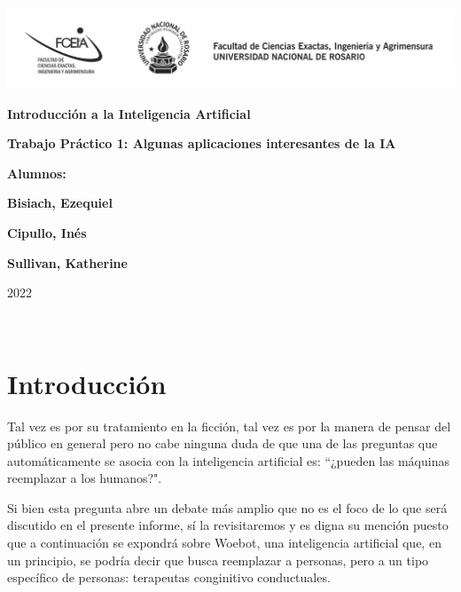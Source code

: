\documentclass[11pt]{article}
\begin{document}
\begin{titlepage}
    \hspace{-2.5cm}\includegraphics[scale= 0.48]{header.png}
    \begin{center}
        \vfill
            \noindent\textbf{\Huge Introducción a la Inteligencia Artificial}\par
            \vspace{.5cm}
            \noindent\textbf{\Huge Trabajo Práctico 1: Algunas aplicaciones interesantes de la IA}\par
            \vspace{.5cm}
        \vfill
        \noindent \textbf{\huge Alumnos:}\par
        \vspace{.5cm}
        \noindent \textbf{\Large Bisiach, Ezequiel}\par
        \noindent \textbf{\Large Cipullo, Inés}\par
        \noindent \textbf{\Large Sullivan, Katherine}\par
 
        \vfill
        \noindent\large 2022
    \end{center}
\end{titlepage}
\ \par


\section{Introducción}
Tal vez es por su tratamiento en la ficción, tal vez es 
por la manera de pensar del público en general pero no
cabe ninguna duda de que una de las preguntas que 
automáticamente se asocia con la inteligencia artificial
es: ``¿pueden las máquinas reemplazar a los humanos?". 

Si 
bien esta pregunta abre un debate más amplio que no es el foco
de lo 
que será discutido en el presente informe, sí la revisitaremos y es digna 
su
mención puesto que a continuación se expondrá sobre
Woebot, una inteligencia artificial que,
en un principio, se podría decir
que busca reemplazar
a personas, pero a un tipo específico de personas: 
terapeutas conginitivo conductuales. 
\end{document}
